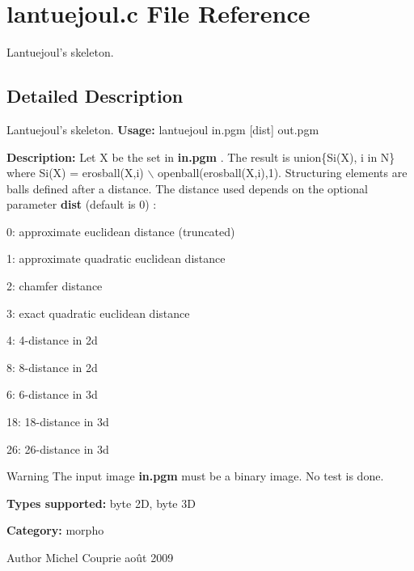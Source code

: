 \section{lantuejoul.c File Reference}
\label{lantuejoul_8c}


Lantuejoul's skeleton.  




\subsection{Detailed Description}
Lantuejoul's skeleton. {\bfseries Usage:} lantuejoul in.pgm [dist] out.pgm

{\bfseries Description:} Let X be the set in {\bfseries in.pgm} . The result is union\{Si(X), i in N\} where Si(X) = erosball(X,i) $\backslash$ openball(erosball(X,i),1). Structuring elements are balls defined after a distance. The distance used depends on the optional parameter {\bfseries dist} (default is 0) : \begin{DoxyItemize}
\item 0: approximate euclidean distance (truncated) \item 1: approximate quadratic euclidean distance \item 2: chamfer distance \item 3: exact quadratic euclidean distance \item 4: 4-\/distance in 2d \item 8: 8-\/distance in 2d \item 6: 6-\/distance in 3d \item 18: 18-\/distance in 3d \item 26: 26-\/distance in 3d\end{DoxyItemize}
\begin{DoxyWarning}{Warning}
The input image {\bfseries in.pgm} must be a binary image. No test is done.
\end{DoxyWarning}
{\bfseries Types supported:} byte 2D, byte 3D

{\bfseries Category:} morpho

\begin{DoxyAuthor}{Author}
Michel Couprie août 2009 
\end{DoxyAuthor}
